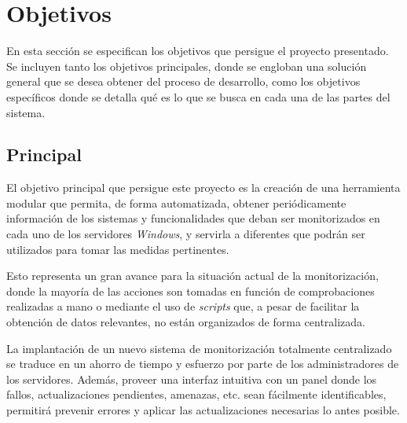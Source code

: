 
\section{Objetivos} \label{sec:obj}
    En esta sección se especifican los objetivos que persigue el proyecto presentado. Se incluyen tanto los objetivos principales, donde se engloban una solución general que se desea obtener del proceso de desarrollo, como los objetivos específicos donde se detalla qué es lo que se busca en cada una de las partes del sistema.

    \subsection{Principal}
        El objetivo principal que persigue este proyecto es la creación de una herramienta modular que permita, de forma automatizada, obtener periódicamente información de los sistemas y funcionalidades que deban ser monitorizados en cada uno de los servidores \textit{Windows}, y servirla a diferentes  que podrán ser utilizados para tomar las medidas pertinentes.
        
        Esto representa un gran avance para la situación actual de la monitorización, donde la mayoría de las acciones son tomadas en función de comprobaciones realizadas a mano o mediante el uso de \textit{scripts} que, a pesar de facilitar la obtención de datos relevantes, no están organizados de forma centralizada.
        
        La implantación de un nuevo sistema de monitorización totalmente centralizado se traduce en un ahorro de tiempo y esfuerzo por parte de los administradores de los servidores. Además, proveer una interfaz intuitiva con un panel donde los fallos, actualizaciones pendientes, amenazas, etc. sean fácilmente identificables, permitirá prevenir errores y aplicar las actualizaciones necesarias lo antes posible.
        
